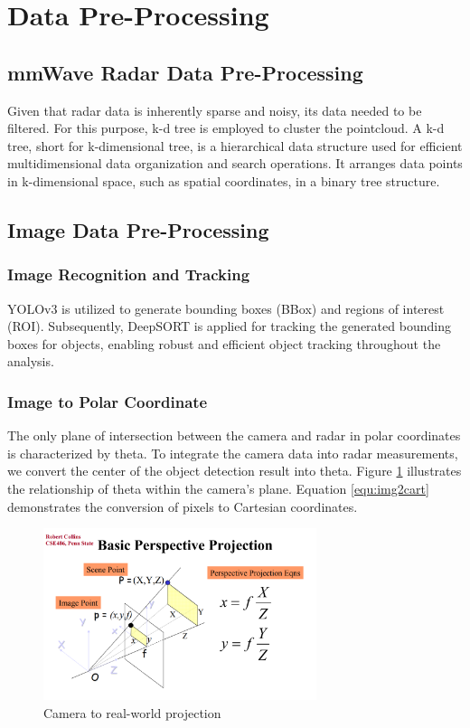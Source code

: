 \section{Data Pre-Processing}\label{sec:2-preprocessing}
\subsection{mmWave Radar Data Pre-Processing}\label{sec:2-kd_tree}
Given that radar data is inherently sparse and noisy, its data needed to be filtered.
For this purpose, k-d tree is employed to cluster the pointcloud.
A k-d tree, short for k-dimensional tree, is a hierarchical data structure used for efficient multidimensional data organization and search operations. 
It arranges data points in k-dimensional space, such as spatial coordinates, in a binary tree structure. 

\subsection{Image Data Pre-Processing}\label{sec:2-img_recognition}
\subsubsection{Image Recognition and Tracking}
YOLOv3 is utilized to generate bounding boxes (BBox) and regions of interest (ROI)\cite{redmon2018yolov3}.
Subsequently, DeepSORT is applied for tracking the generated bounding boxes for objects, 
enabling robust and efficient object tracking throughout the analysis\cite{Wojke2017simple}.

\subsubsection{Image to Polar Coordinate}
The only plane of intersection between the camera and radar in polar coordinates is characterized by theta. 
To integrate the camera data into radar measurements, 
we convert the center of the object detection result into theta. 
Figure \ref{fig:camera_projection} illustrates the relationship of theta within the camera's plane. 
Equation \ref{equ:img2cart} demonstrates the conversion of pixels to Cartesian coordinates.
\begin{figure}[hpbt]
    \centering
    \includegraphics[width=8cm]{Figures/cam_projection.png}%
    \caption{Camera to real-world projection}
    \label{fig:camera_projection}
\end{figure}

